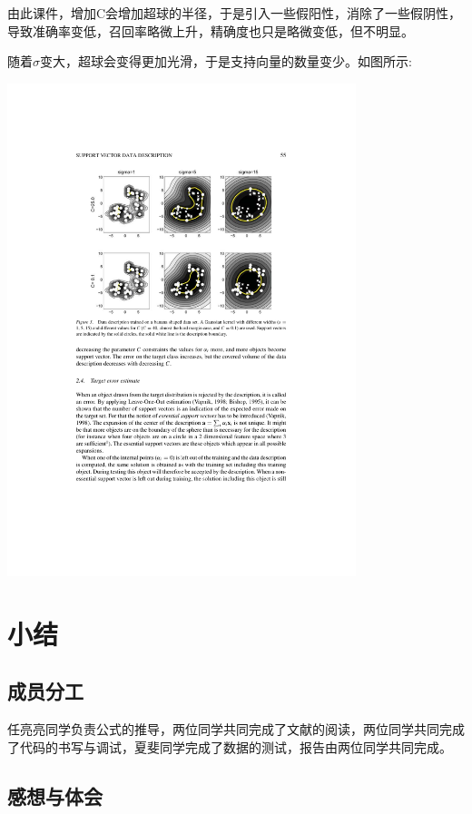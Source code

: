 \documentclass[article,12pt]{article}
\begin{document}
由此课件，增加C会增加超球的半径，于是引入一些假阳性，消除了一些假阴性，导致准确率变低，召回率略微上升，精确度也只是略微变低，但不明显。


随着$\sigma$变大，超球会变得更加光滑，于是支持向量的数量变少。如图所示:
\begin{center}
\includegraphics[width = 4in]{shit.pdf}
\end{center}



\section{小结}

\subsection{成员分工}

任亮亮同学负责公式的推导，两位同学共同完成了文献的阅读，两位同学共同完成了代码的书写与调试，夏斐同学完成了数据的测试，报告由两位同学共同完成。

\subsection{感想与体会}
\end{document}

